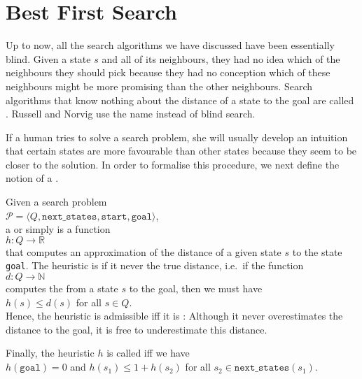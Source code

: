 \section{Best First Search}
Up to now, all the search algorithms we have discussed have been essentially blind.  Given a state $s$ and
all of its neighbours, they had no idea which of the neighbours they should pick because they had no conception
which of these neighbours might be more promising than the other neighbours.  Search algorithms that know nothing
about the distance of a state to the goal are called .  
Russell and Norvig \cite{russell:2020} use the name  instead of blind search.

If a human tries to solve a search
problem, she will usually develop an intuition that certain states are more favourable than other states because
they seem to be closer to the solution.  In order to formalise this procedure, we next define the notion of a
. 


\begin{Definition}
Given a search problem
\\[0.2cm]
\hspace*{1.3cm}
$\mathcal{P} = \langle Q, \mathtt{next\_states}, \mathtt{start}, \mathtt{goal} \rangle$,
\\[0.2cm]
a  or simply  is a function 
\\[0.2cm]
\hspace*{1.3cm}
$h: Q \rightarrow \mathbb{R}$
\\[0.2cm]
that computes an approximation of the distance of a given state $s$ to the state \texttt{goal}.
The heuristic is   if it never
\underline{\color{red}{overestimates}} the true distance, i.e.~if the function 
\\[0.2cm]
\hspace*{1.3cm}
$d:Q \rightarrow \mathbb{N}$
\\[0.2cm]
computes the  from a state $s$ to the goal, then we must have
\\[0.2cm]
\hspace*{1.3cm}
$h(s) \leq d(s)$ \quad for all $s \in Q$.
\\[0.2cm]
Hence, the heuristic is admissible iff it is : 
Although it never overestimates the distance to the goal, it is free to underestimate this distance.

Finally, the  heuristic $h$ is called   iff we have 
\\[0.2cm]
\hspace*{1.3cm}
$h(\mathtt{goal}) = 0$ \quad and \quad $h(s_1) \leq 1 + h(s_2)$ \quad for all $s_2 \in \mathtt{next\_states}(s_1)$.  \eod
\end{Definition}

